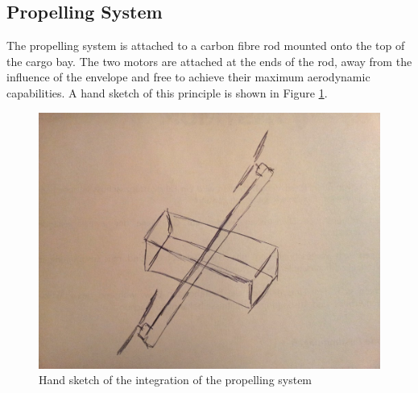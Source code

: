 \subsection{Propelling System}
%
The propelling system is attached to a carbon fibre rod mounted onto the top of the cargo bay. The two motors are attached at the ends of the rod, away from the influence of the envelope and free to achieve their maximum aerodynamic capabilities. A hand sketch of this principle is shown in Figure \ref{fig:prop}.
%
\begin{figure}[h!]
\centering
\includegraphics[scale = 0.3]{figures/prop.jpg}
\caption{Hand sketch of the integration of the propelling system}
\label{fig:prop}
\end{figure}
%
